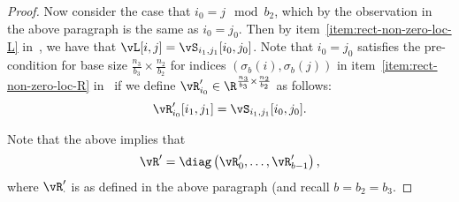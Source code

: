 \begin{proof}
Now consider the case that $i_0=j\mod b_2$, which by the observation in the above paragraph is the same as $i_0=j_0$. Then by item~\ref{item:rect-non-zero-loc-L} in~, we have that $\vL[i,j]=\vS_{i_1,j_1}[i_0,j_0]$.  Note that $i_0= j_0$ satisfies the pre-condition for base size $\frac{n_3}{b_3}\times \frac{n_2}{b_2}$ for indices $(\sigma_b(i),\sigma_b(j))$ in item~\ref{item:rect-non-zero-loc-R} in~ if we define $\vR'_{i_0}\in\R^{\frac{n_3}{b_3}\times\frac{n_2}{b_2}}$ as follows:
\[\vR'_{i_0}[i_1,j_1]=\vS_{i_1,j_1}[i_0,j_0].\] 

Note that the above implies that 
\[\vR'=\diag\parens{\vR'_0,\dots,\vR'_{b-1}},\]
where $\vR'_{\cdot}$ is as defined in the above paragraph (and recall $b=b_2=b_3$.
\end{proof}